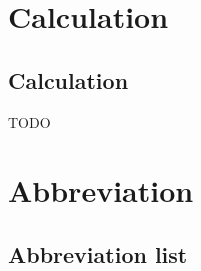 \documentclass[letterpaper,10pt,english]{sphinxmanual}
\begin{document}
\chapter{Calculation}
\label{\detokenize{index:calculation}}

\section{Calculation}
\label{\detokenize{calculation:calculation}}\label{\detokenize{calculation::doc}}
\sphinxAtStartPar
TODO


\chapter{Abbreviation}
\label{\detokenize{index:abbreviation}}

\section{Abbreviation list}
\label{\detokenize{abbrev:abbreviation-list}}\label{\detokenize{abbrev::doc}}
\end{document}
